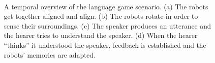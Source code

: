 \begin{figure}
\centering
{}
\\
\caption{A temporal overview of the language game scenario. (a) The robots get together aligned and align. (b) The robots rotate in order to sense their surroundings. (c) The speaker produces an utterance and the hearer tries to understand the speaker. (d) When the hearer ``thinks'' it understood the speaker, feedback is established and the robots' memories are adapted.}
\label{f:scheme}
\end{figure}




